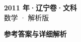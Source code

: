 \documentclass[zihao=-4, a4paper]{ctexart}
\begin{document}
\begin{center}
  {\Large\bfseries 2011 年·辽宁卷·文科}\\[4pt]
  {\large 数学 · 解析版}
\end{center}
\medskip
{}

\clearpage
{}
\begin{center}{\Large\bfseries 参考答案与详细解析}\end{center}
\medskip

\end{document}

